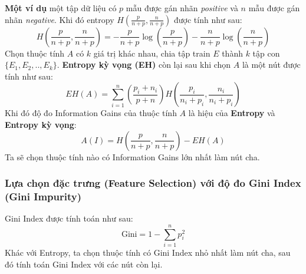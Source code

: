 \documentclass[12pt]{article}
\begin{document}
\textbf{Một ví dụ} một tập dữ liệu có $p$ mẫu được gán nhãn \textit{positive} và $n$ mẫu được gán nhãn \textit{negative}. Khi đó entropy $H(\frac{p}{n + p}, \frac{n}{n + p})$ được tính như sau:
$$
H\left(\frac{p}{n + p}, \frac{n}{n + p}\right) = -\frac{p}{n + p}\log\left(\frac{p}{n + p}\right) - \frac{n}{n + p}\log\left(\frac{n}{n + p}\right)
$$
Chọn thuộc tính $A$ có $k$ giá trị khác nhau, chia tập train $E$ thành $k$ tập con $\{E_1, E_2, .., E_k\}$. \textbf{Entropy kỳ vọng (EH)} còn lại sau khi chọn $A$ là một nút được tính như sau:
\begin{equation}
EH(A) = \sum_{i = 1}^{n}\left(\frac{p_i + n_i}{p + n}\right)H\left(\frac{p_i}{n_i + p_i}, \frac{n_i}{n_i + p_i}\right)
\end{equation}
Khi đó độ đo Information Gains của thuộc tính $A$ là hiệu của \textbf{Entropy} và \textbf{Entropy kỳ vọng}:
\begin{equation}
A(I) = H\left(\frac{p}{n + p}, \frac{n}{n + p}\right) - EH(A)
\end{equation}
Ta sẽ chọn thuộc tính nào có Information Gains lớn nhất làm nút cha.

\subsubsection{Lựa chọn đặc trưng (Feature Selection) với độ đo Gini Index (Gini Impurity)}
Gini Index được tính toán như sau:
\begin{equation}\label{eq:gini}
\text{Gini} = 1 - \sum_{i = 1}^n p_i ^ 2
\end{equation}
Khác với Entropy, ta chọn thuộc tính có Gini Index nhỏ nhất làm nút cha, sau đó tính toán Gini Index với các nút còn lại.
\end{document}
